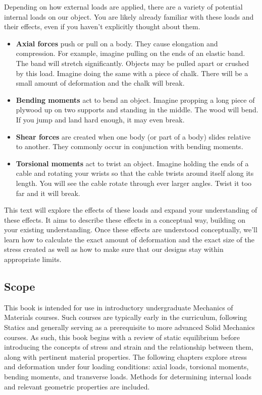 \documentclass[
  letterpaper,
  DIV=11,
  numbers=noendperiod]{scrreprt}
\theoremstyle{definition}
\theoremstyle{remark}
\begin{document}
Depending on how external loads are applied, there are a variety of
potential internal loads on our object. You are likely already familiar
with these loads and their effects, even if you haven't explicitly
thought about them.

\begin{itemize}
\item
  \textbf{Axial forces} push or pull on a body. They cause elongation
  and compression. For example, imagine pulling on the ends of an
  elastic band. The band will stretch significantly. Objects may be
  pulled apart or crushed by this load. Imagine doing the same with a
  piece of chalk. There will be a small amount of deformation and the
  chalk will break.
\item
  \textbf{Bending moments} act to bend an object. Imagine propping a
  long piece of plywood up on two supports and standing in the middle.
  The wood will bend. If you jump and land hard enough, it may even
  break.
\item
  \textbf{Shear forces} are created when one body (or part of a body)
  slides relative to another. They commonly occur in conjunction with
  bending moments.
\item
  \textbf{Torsional moments} act to twist an object. Imagine holding the
  ends of a cable and rotating your wrists so that the cable twists
  around itself along its length. You will see the cable rotate through
  ever larger angles. Twist it too far and it will break.
\end{itemize}

This text will explore the effects of these loads and expand your
understanding of these effects. It aims to describe these effects in a
conceptual way, building on your existing understanding. Once these
effects are understood conceptually, we'll learn how to calculate the
exact amount of deformation and the exact size of the stress created as
well as how to make sure that our designs stay within appropriate
limits.

\subsection*{Scope}\label{scope}

This book is intended for use in introductory undergraduate Mechanics of
Materials courses. Such courses are typically early in the curriculum,
following Statics and generally serving as a prerequisite to more
advanced Solid Mechanics courses. As such, this book begins with a
review of static equilibrium before introducing the concepts of stress
and strain and the relationship between them, along with pertinent
material properties. The following chapters explore stress and
deformation under four loading conditions: axial loads, torsional
moments, bending moments, and transverse loads. Methods for determining
internal loads and relevant geometric properties are included.
\end{document}
